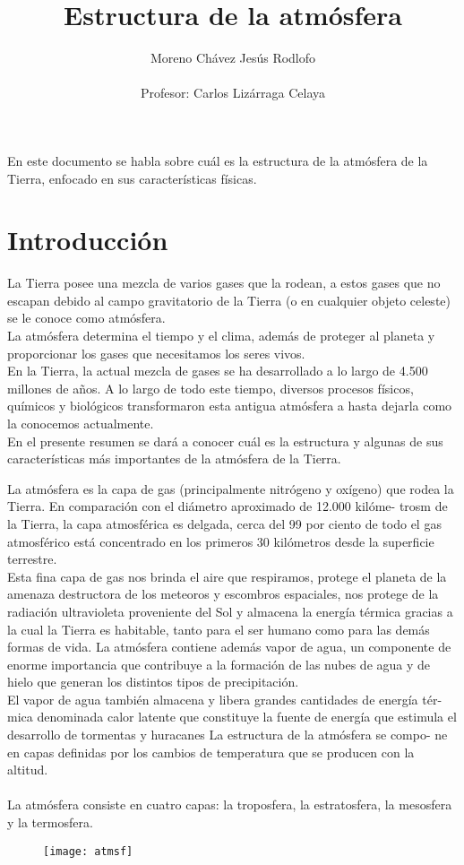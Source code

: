\documentclass{article}
\title{\vspace*{2.5in} \Huge Estructura de la atmósfera}
\author{\LARGE Moreno Chávez Jesús Rodlofo \\ \\ \LARGE Profesor: Carlos Lizárraga Celaya}
\begin{document}
\maketitle
\newpage
En este documento se habla sobre cuál es la estructura  de la atmósfera de la Tierra, enfocado en sus características físicas.

\section*{Introducción}
La Tierra posee una mezcla de varios gases que la rodean, a estos gases que no escapan debido al campo gravitatorio de la Tierra (o en cualquier objeto celeste) se le conoce como atmósfera.\\
La atmósfera determina el tiempo y el clima, además de  proteger al planeta y proporcionar los gases que necesitamos los seres vivos.\\
En la Tierra, la actual mezcla de gases se ha desarrollado a lo largo de 4.500 millones de años. A lo largo de todo este tiempo, diversos procesos físicos, químicos y biológicos transformaron esta antigua atmósfera a hasta dejarla como la conocemos actualmente.\\  
En el presente resumen se dará a conocer cuál es la estructura y algunas de sus características más importantes de la atmósfera de la Tierra.


\newpage
La atmósfera es la capa de gas (principalmente nitrógeno y oxígeno) que
rodea la Tierra. En comparación con el diámetro aproximado de 12.000 kilóme-
trosm de la Tierra, la capa atmosférica es delgada, cerca del 99 por ciento de
todo el gas atmosférico está concentrado en los primeros 30 kilómetros desde la
superficie terrestre.\\
Esta fina capa de gas nos brinda el aire que respiramos, protege el planeta de la
amenaza destructora de los meteoros y escombros espaciales, nos protege de la
radiación ultravioleta proveniente del Sol y almacena la energía térmica gracias
a la cual la Tierra es habitable, tanto para el ser humano como para las demás
formas de vida. La atmósfera contiene además vapor de agua, un componente
de enorme importancia que contribuye a la formación de las nubes de agua y de
hielo que generan los distintos tipos de precipitación.\\
El vapor de agua también almacena y libera grandes cantidades de energía tér-
mica denominada calor latente que constituye la fuente de energía que estimula
el desarrollo de tormentas y huracanes La estructura de la atmósfera se compo-
ne en capas definidas por los cambios de temperatura que se producen con la
altitud.\\ \\
La atmósfera consiste en cuatro capas: la troposfera, la estratosfera, la mesosfera
y la termosfera.
\begin{figure}[h]
\centering
\texttt{[image: atmsf]}
\caption{}
\end{figure}
\end{document}
